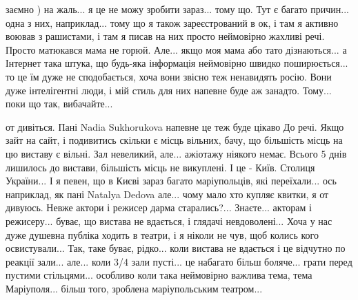 заємно ) на жаль... я це не можу зробити зараз... тому що. Тут є багато
причин... одна з них, наприклад... тому що я також зареєстрований в ок, і там я
активно воював з рашистами, і там я писав на них просто неймовірно жахливі
речі. Просто матюкався мама не горюй. Але... якщо моя мама або тато
дізнаються... а Інтернет така штука, що будь-яка інформація неймовірно швидко
поширюється... то це їм дуже не сподобається, хоча вони звісно теж ненавидять
росію. Вони дуже інтелігентні люди, і мій стиль для них напевне буде аж
занадто. Тому... поки що так, вибачайте...



от дивіться. Пані Nadia Sukhorukova напевне це теж буде цікаво До речі. Якщо
зайт на сайт, і подивитись скільки є місць вільних, бачу, що більшість місць на
цю виставу є вільні. Зал невеликий, але... ажіотажу ніякого немає. Всього 5
днів лишилось до вистави, більшість місць не викуплені. І це - Київ. Столиця
України... І я певен, що в Києві зараз багато маріупольців, які переїхали...
ось наприклад, як пані Natalya Dedova але... чому мало хто купляє квитки, я от
дивуюсь. Невже актори і режисер дарма старались?... Знаєте... акторам і
режисеру... буває, що вистава не вдається, і глядачі невдоволені... Хоча у нас
дуже душевна публіка ходить в театри, і я ніколи не чув, щоб колись кого
освистували... Так, таке буває, рідко... коли вистава не вдається і це відчутно
по реакції зали... але... коли 3/4 зали пусті... це набагато більш боляче...
грати перед пустими стільцями... особливо коли така неймовірно важлива тема,
тема Маріуполя... більш того, зроблена маріупольським театром...

